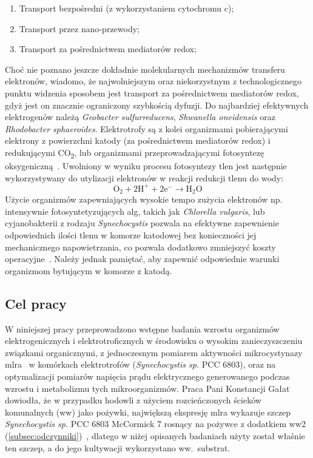 \begin{enumerate}
    \item Transport bezpośredni (z wykorzystaniem cytochromu c);
    \item Transport przez nano-przewody;
    \item Transport za pośrednictwem mediatorów redox;
\end{enumerate}

Choć nie poznano jeszcze dokładnie molekularnych mechanizmów
transferu elektronów, wiadomo, że najwolniejszym oraz
niekorzystnym z technologicznego punktu widzenia sposobem jest
transport za pośrednictwem mediatorów redox, gdyż jest on znacznie
ograniczony szybkością dyfuzji.
Do najbardziej efektywnych elektrogenów należą
\textit{Geobacter sulfurreducens}, \textit{Shwanella oneidensis}
oraz \textit{Rhodobacter sphaeroides}.
Elektrotrofy są z kolei organizmami pobierającymi elektrony
z powierzchni katody (za pośrednictwem mediatorów redox)
i redukującymi CO\textsubscript{2}, lub organizmami przeprowadzającymi fotosyntezę
oksygeniczną~\cite{Santoro2017, Reddy2019}.
Uwolniony w wyniku procesu fotosyntezy tlen jest następnie wykorzystywany
do utylizacji elektronów w reakcji redukcji tlenu do wody:
\begin{equation}
    \label{eq:2}
    \mathrm{O_2 + 2H^+ + 2e^- \rightarrow H_2 O}
\end{equation}
Użycie organizmów zapewniających wysokie tempo zużycia elektronów np.
intensywnie fotosyntetyzujących alg, takich jak \textit{Chlorella vulgaris},
lub cyjanobakterii z rodzaju \textit{Synechocystis} pozwala na efektywne
zapewnienie odpowiednich ilości tlenu w komorze katodowej bez
konieczności jej mechanicznego napowietrzania, co pozwala dodatkowo
zmniejszyć koszty operacyjne~\cite{Reddy2019}.
Należy jednak pamiętać, aby zapewnić odpowiednie warunki
organizmom bytującym w komorze z katodą.

\subsection{Cel pracy}\label{subsec:badania}
W niniejszej pracy przeprowadzono wstępne badania wzrostu organizmów
elektrogenicznych i elektrotroficznych
w środowisku o wysokim zanieczyszczeniu związkami
organicznymi, z jednoczesnym pomiarem aktywności mikrocystynazy
\acrshort{mlra}~\cite{Dexter2018, Dexter2021} w komórkach elektrotrofów
(\textit{Synechocystis sp.} PCC 6803),
oraz na optymalizacji pomiarów napięcia prądu elektrycznego generowanego
podczas wzrostu i metabolizmu tych mikroorganizmów.
Praca Pani Konstancji Gałat dowiodła, że w przypadku
hodowli z użyciem rozcieńczonych ścieków komunalnych (\acrshort{ww})
jako pożywki, największą ekspresję \acrshort{mlra} wykazuje szczep
\textit{Synechocystis sp.} PCC 6803 McCormick 7 rosnący na pożywce
z dodatkiem \acrshort{ww}2 (\ref{subsec:odczynniki})~\cite{Galat2022},
dlatego w niżej opisanych badaniach użyty został właśnie ten szczep,
a do jego kultywacji wykorzystano ww.\ substrat.